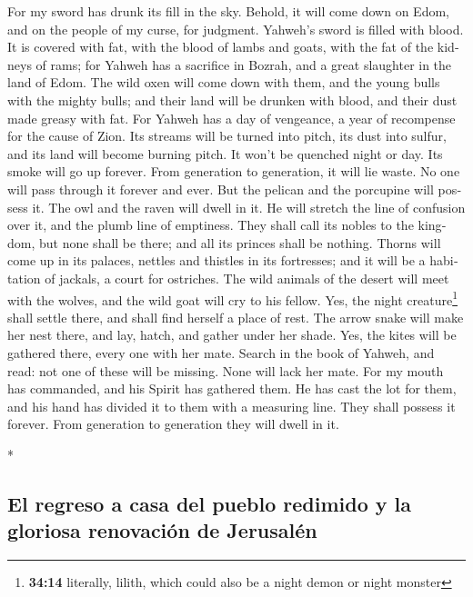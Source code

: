 \begin{paracol}{2}
\begin{otherlanguage}{english}
 For my sword has drunk its fill in the sky. Behold, it
will come down on Edom, and on the people of my curse, for judgment.
 Yahweh's sword is filled with blood. It is covered with
fat, with the blood of lambs and goats, with the fat of the kidneys of
rams; for Yahweh has a sacrifice in Bozrah, and a great slaughter in the
land of Edom.  The wild oxen will come down with them, and
the young bulls with the mighty bulls; and their land will be drunken
with blood, and their dust made greasy with fat.  For
Yahweh has a day of vengeance, a year of recompense for the cause of
Zion.  Its streams will be turned into pitch, its dust
into sulfur, and its land will become burning pitch.  It
won't be quenched night or day. Its smoke will go up forever. From
generation to generation, it will lie waste. No one will pass through it
forever and ever.  But the pelican and the porcupine will
possess it. The owl and the raven will dwell in it. He will stretch the
line of confusion over it, and the plumb line of emptiness.
 They shall call its nobles to the kingdom, but none
shall be there; and all its princes shall be nothing. 
Thorns will come up in its palaces, nettles and thistles in its
fortresses; and it will be a habitation of jackals, a court for
ostriches.  The wild animals of the desert will meet with
the wolves, and the wild goat will cry to his fellow. Yes, the night
creature\footnote{\textbf{34:14} literally, lilith, which could also be
  a night demon or night monster} shall settle there, and shall find
herself a place of rest.  The arrow snake will make her
nest there, and lay, hatch, and gather under her shade. Yes, the kites
will be gathered there, every one with her mate.  Search
in the book of Yahweh, and read: not one of these will be missing. None
will lack her mate. For my mouth has commanded, and his Spirit has
gathered them.  He has cast the lot for them, and his
hand has divided it to them with a measuring line. They shall possess it
forever. From generation to generation they will dwell in it.

\end{otherlanguage}

\switchcolumn[0]*

\hypertarget{el-regreso-a-casa-del-pueblo-redimido-y-la-gloriosa-renovaciuxf3n-de-jerusaluxe9n}{%
\subsection{El regreso a casa del pueblo redimido y la gloriosa
renovación de
Jerusalén}\label{el-regreso-a-casa-del-pueblo-redimido-y-la-gloriosa-renovaciuxf3n-de-jerusaluxe9n}}


\end{paracol}
